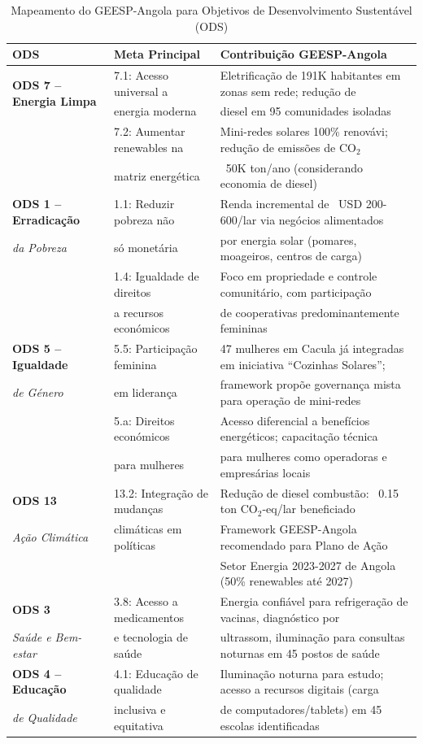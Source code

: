 \documentclass[12pt, a4paper]{article}
\begin{document}
\begin{table}[H]
\centering
\caption{Mapeamento do GEESP-Angola para Objetivos de Desenvolvimento Sustentável (ODS)}
\label{tab:sdg_alignment}
\small
\begin{tabular}{|l|l|l|}
\hline
\textbf{ODS} & \textbf{Meta Principal} & \textbf{Contribuição GEESP-Angola} \\
\hline
\multirow{2}{*}{\textbf{ODS 7 -- Energia Limpa}} & 7.1: Acesso universal a & Eletrificação de 191K habitantes em zonas sem rede; redução de \\
\textit{Energia Acessível e Limpa} & energia moderna & diesel em 95 comunidades isoladas \\
& 7.2: Aumentar renewables na & Mini-redes solares 100\% renovávi; redução de emissões de CO$_2$ \\
& matriz energética & ~50K ton/ano (considerando economia de diesel) \\
\hline
\textbf{ODS 1 -- Erradicação} & 1.1: Reduzir pobreza não & Renda incremental de ~USD 200-600/lar via negócios alimentados \\
\textit{da Pobreza} & só monetária & por energia solar (pomares, moageiros, centros de carga) \\
& 1.4: Igualdade de direitos & Foco em propriedade e controle comunitário, com participação \\
& a recursos económicos & de cooperativas predominantemente femininas \\
\hline
\textbf{ODS 5 -- Igualdade} & 5.5: Participação feminina & 47 mulheres em Cacula já integradas em iniciativa ``Cozinhas Solares''; \\
\textit{de Género} & em liderança & framework propõe governança mista para operação de mini-redes \\
& 5.a: Direitos económicos & Acesso diferencial a benefícios energéticos; capacitação técnica \\
& para mulheres & para mulheres como operadoras e empresárias locais \\
\hline
\textbf{ODS 13} & 13.2: Integração de mudanças & Redução de diesel combustão: ~0.15 ton CO$_2$-eq/lar beneficiado \\
\textit{Ação Climática} & climáticas em políticas & Framework GEESP-Angola recomendado para Plano de Ação \\
& & Setor Energia 2023-2027 de Angola (50\% renewables até 2027) \\
\hline
\textbf{ODS 3} & 3.8: Acesso a medicamentos & Energia confiável para refrigeração de vacinas, diagnóstico por \\
\textit{Saúde e Bem-estar} & e tecnologia de saúde & ultrassom, iluminação para consultas noturnas em 45 postos de saúde \\
\hline
\textbf{ODS 4 -- Educação} & 4.1: Educação de qualidade & Iluminação noturna para estudo; acesso a recursos digitais (carga \\
\textit{de Qualidade} & inclusiva e equitativa & de computadores/tablets) em 45 escolas identificadas \\
\hline
\end{tabular}
\end{table}
\end{document}
